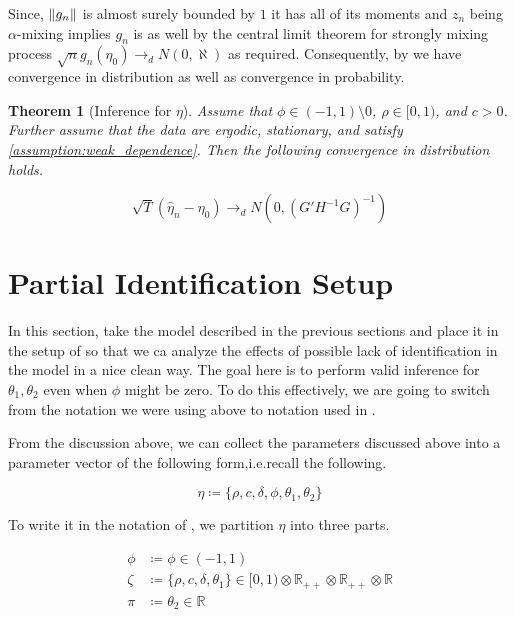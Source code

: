 \documentclass[11pt]{article}
\newtheorem{Theorem}{Theorem}[section]
\newcommand*{\R}{\mathbb{R}}
\newcommand*{\N}{N}
\newcommand*{\dto}{\ensuremath{\to_d}}
\newcommand*{\Eta}{H}
\DeclarePairedDelimiter\norm{\lVert}{\rVert}
\begin{document}
Since, $\norm*{g_n}$ is almost surely bounded by $1$ it has all of its moments and $z_n$ being $\alpha$-mixing
implies $g_n$ is as well by the central limit theorem for strongly mixing process 
$\sqrt{n} g_n(\eta_0) \dto \N(0,\aleph)$ as required. 
Consequently, by \textcite[Theorem 3.2]{newey1994large} we have convergence in distribution as well as convergence
in probability.

\begin{Theorem}[Inference for $\eta$]
    Assume that $\phi  \in (-1,1) \setminus 0$, $\rho \in [0,1)$, and $c > 0$. 
    Further assume that the data are ergodic, stationary, and satisfy \cref{assumption:weak_dependence}.
    Then the following convergence in distribution holds.

    \begin{equation}
        \sqrt{T} (\widehat{\eta}_n - \eta_{0}) \dto \N\left(0, \left(G' \Eta^{-1} G\right)^{-1}\right)
    \end{equation}
\end{Theorem}


\section{Partial Identification Setup}

In this section, take the model described in the previous sections and place it in the setup of
\textcite{andrewsGmm2014} so that we ca analyze the effects of possible lack of identification in the model in a
nice clean way.
The goal here is to perform valid inference for $\theta_1, \theta_2$ even when $\phi$ might be zero. 
To do this effectively, we are going to switch from the notation we were using above to notation used in
\textcite{andrewsGmm2014}. 


From the discussion above, we can collect the parameters discussed above into a parameter vector of the following
form,i.e.\@ recall the following.

\begin{equation}
    \eta \coloneqq \lbrace \rho, c, \delta, \phi, \theta_1, \theta_2 \rbrace
\end{equation}

To write it in the notation of \textcite{andrewsGmm2014}, we partition $\eta$ into three parts.

\begin{align}
    \phi &\coloneqq \phi  \in (-1, 1) \\ 
    \zeta &\coloneqq \lbrace \rho, c, \delta, \theta_1 \rbrace \in [0,1) \otimes \R_{++} \otimes \R_{++} \otimes
    \R  \\
    \pi &\coloneqq \theta_2 \in \R 
\end{align}
\end{document}
